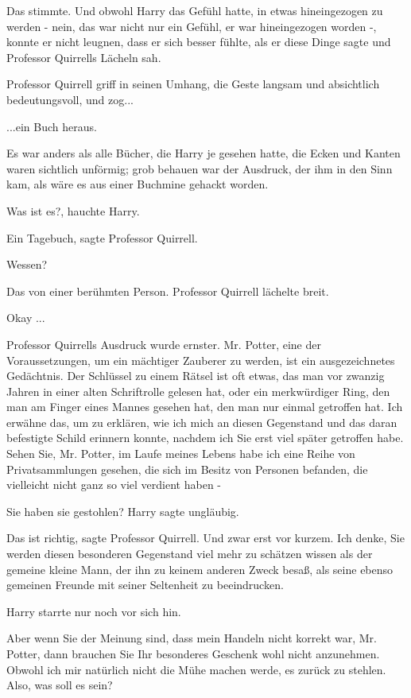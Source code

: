 Das stimmte. Und obwohl Harry das Gefühl hatte, in etwas hineingezogen zu werden
- nein, das war nicht nur ein Gefühl, er war hineingezogen worden -, konnte er
nicht leugnen, dass er sich besser fühlte, als er diese Dinge sagte und
Professor Quirrells Lächeln sah.

Professor Quirrell griff in seinen Umhang, die Geste langsam und absichtlich
bedeutungsvoll, und zog...

...ein Buch heraus.

Es war anders als alle Bücher, die Harry je gesehen hatte, die Ecken und Kanten
waren sichtlich unförmig; grob behauen war der Ausdruck, der ihm in den Sinn
kam, als wäre es aus einer Buchmine gehackt worden.

\glqq{}Was ist es?\grqq{}, hauchte Harry.

\glqq{}Ein Tagebuch\grqq{}, sagte Professor Quirrell.

\glqq{}Wessen?\grqq{}

\glqq{}Das von einer berühmten Person.\grqq{} Professor Quirrell lächelte breit.

\glqq{}Okay ...\grqq{}

Professor Quirrells Ausdruck wurde ernster. \glqq{}Mr. Potter, eine der
Voraussetzungen, um ein mächtiger Zauberer zu werden, ist ein ausgezeichnetes
Gedächtnis. Der Schlüssel zu einem Rätsel ist oft etwas, das man vor zwanzig
Jahren in einer alten Schriftrolle gelesen hat, oder ein merkwürdiger Ring, den
man am Finger eines Mannes gesehen hat, den man nur einmal getroffen hat. Ich
erwähne das, um zu erklären, wie ich mich an diesen Gegenstand und das daran
befestigte Schild erinnern konnte, nachdem ich Sie erst viel später getroffen
habe. Sehen Sie, Mr. Potter, im Laufe meines Lebens habe ich eine Reihe von
Privatsammlungen gesehen, die sich im Besitz von Personen befanden, die
vielleicht nicht ganz so viel verdient haben -\grqq{}

\glqq{}Sie haben sie gestohlen?\grqq{} Harry sagte ungläubig.

\glqq{}Das ist richtig\grqq{}, sagte Professor Quirrell. \glqq{}Und zwar erst
vor kurzem. Ich denke, Sie werden diesen besonderen Gegenstand viel mehr zu
schätzen wissen als der gemeine kleine Mann, der ihn zu keinem anderen Zweck
besaß, als seine ebenso gemeinen Freunde mit seiner Seltenheit zu
beeindrucken.\grqq{}

Harry starrte nur noch vor sich hin.

\glqq{}Aber wenn Sie der Meinung sind, dass mein Handeln nicht korrekt war, Mr.
Potter, dann brauchen Sie Ihr besonderes Geschenk wohl nicht anzunehmen. Obwohl
ich mir natürlich nicht die Mühe machen werde, es zurück zu stehlen. Also, was
soll es sein?\grqq{}


